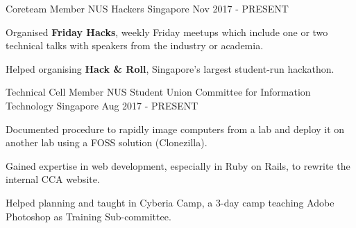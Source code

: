 

\begin{cventries}

 \cventry
    {Coreteam Member} %
    {NUS Hackers} %
    {Singapore} %
    {Nov 2017 - PRESENT} %
    {
      \begin{cvitems} %
      	\item {Organised \textbf{Friday Hacks}, weekly Friday meetups which include one or two technical talks with speakers from the industry or academia.}
      	\item {Helped organising \textbf{Hack \& Roll}, Singapore's largest student-run hackathon.}
      \end{cvitems}
    }
    
  \cventry
    {Technical Cell Member} %
    {NUS Student Union Committee for Information Technology} %
    {Singapore} %
    {Aug 2017 - PRESENT} %
    {
      \begin{cvitems} %
      	\item {Documented procedure to rapidly image computers from a lab and deploy it on another lab using a FOSS solution (Clonezilla).}
        \item {Gained expertise in web development, especially in Ruby on Rails, to rewrite the internal CCA website.}
        \item {Helped planning and taught in Cyberia Camp, a 3-day camp teaching Adobe Photoshop as Training Sub-committee.}
      \end{cvitems}
    }
    
\end{cventries}
